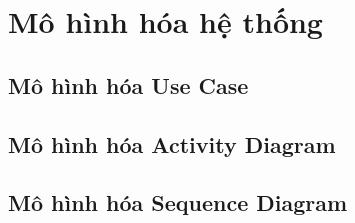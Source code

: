 \section{Mô hình hóa hệ thống}
\subsection{Mô hình hóa Use Case}









\subsection{Mô hình hóa Activity Diagram}






\subsection{Mô hình hóa Sequence Diagram}




